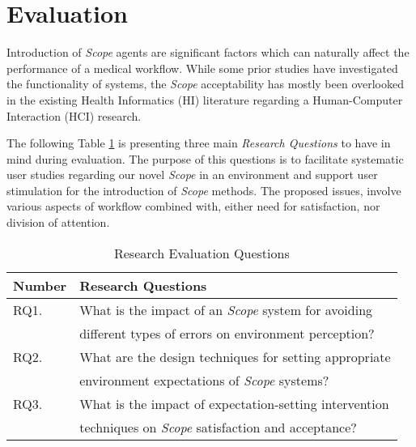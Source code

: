 
\section{Evaluation}
\label{sec:sec006}

Introduction of \textit{Scope} agents are significant factors which can naturally affect the performance of a medical workflow. While some prior studies have investigated the functionality of systems, the \textit{Scope} acceptability has mostly been overlooked in the existing Health Informatics (HI) literature regarding a Human-Computer Interaction (HCI) research.

The following Table \ref{table:usability_evaluation_questions} is presenting three main \textit{Research Questions} to have in mind during evaluation. The purpose of this questions is to facilitate systematic user studies regarding our novel \textit{Scope} in an environment and support user stimulation for the introduction of \textit{Scope} methods. The proposed issues, involve various aspects of workflow combined with, either need for satisfaction, nor division of attention.

\hfill

\begin{table}[h]
\centering
\begin{tabular}{l|l}
Number & Research Questions                             	              \\ \hline
RQ1.   & What is the impact of an {\it Scope} system for avoiding     \\
       & different types of errors on environment perception?         \\ \hline
RQ2.   & What are the design techniques for setting appropriate       \\
       & environment expectations of {\it Scope} systems?             \\ \hline
RQ3.   & What is the impact of expectation-setting intervention       \\
       & techniques on {\it Scope} satisfaction and acceptance?       \\ \hline

\end{tabular}
\caption{Research Evaluation Questions}
\label{table:usability_evaluation_questions}
\end{table}

